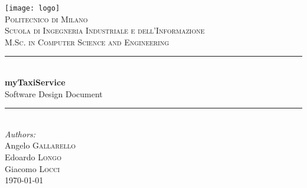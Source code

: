 \documentclass[12pt, a4paper]{article}
\begin{document}
\begin{titlepage}

\newcommand{\HRule}{\rule{\linewidth}{0.5mm}} %

\center %

\texttt{[image: logo]}\\[0.5cm] %
 

\textsc{\LARGE Politecnico di Milano}\\[0.4cm] %
\textsc{\Large Scuola di Ingegneria Industriale e dell'Informazione}\\[0.1cm] %
\textsc{\large M.Sc. in Computer Science and Engineering}\\[1.8cm] %

 


\HRule \\[0.4cm]
{ \huge \bfseries myTaxiService} \\[0.2cm]%
	{\Large Software Design Document}
\HRule \\[1.5cm]
 


\large \emph{Authors:}\\
Angelo  \textsc{Gallarello}\\
Edoardo  \textsc{Longo}\\
Giacomo  \textsc{Locci}\\[1.5cm]


{\large \today} %



\vfill %

\end{titlepage}
\end{document}
